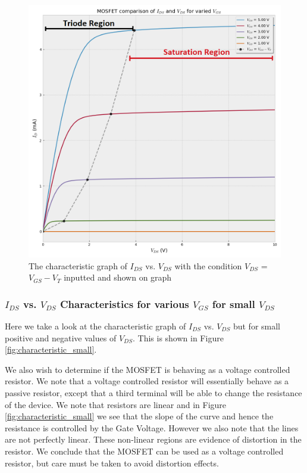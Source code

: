 \begin{figure}[ht]
    \centering
    \includegraphics[width=.95\linewidth]{figures/characteristic_intercept_labelled.png}
    \caption{The characteristic graph of $I_{DS}$ vs. $V_{DS}$ with the condition $V_{DS}$ = $V_{GS} - V_T$ inputted and shown on graph}
    \label{fig:characteristic_intercept}
\end{figure}

\clearpage

\subsubsection{\texorpdfstring{$I_{DS}$ vs. $V_{DS}$ Characteristics for various $V_{GS}$ for small $V_{DS}$}{Dump to Source Current vs Small Voltage Characteristics for various Gate to Source Voltages}}

Here we take a look at the characteristic graph of $I_{DS}$ vs. $V_{DS}$ but for small positive and negative values of $V_{DS}$. This is shown in Figure \ref{fig:characteristic_small}. 

We also wish to determine if the MOSFET is behaving as a voltage controlled resistor. We note that a voltage controlled resistor will essentially behave as a passive resistor, except that a third terminal will be able to change the resistance of the device. We note that resistors are linear and in Figure \ref{fig:characteristic_small} we see that the slope of the curve and hence the resistance is controlled by the Gate Voltage. However we also note that the lines are not perfectly linear. These non-linear regions are evidence of distortion in the resistor. We conclude that the MOSFET can be used as a voltage controlled resistor, but care must be taken to avoid distortion effects.

